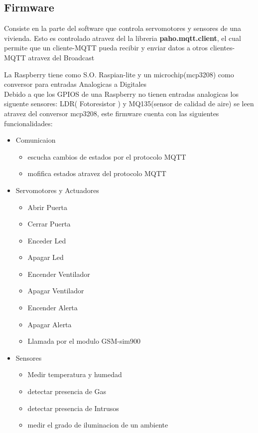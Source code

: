 \documentclass[letterpaper,12pt]{article}
\begin{document}
{\begin{figure}[h]
		\end{figure}
		
		\newpage
		\subsection{Firmware}
		
		Consiste en la parte del software que controla servomotores y sensores de una vivienda. Esto es controlado atravez del la libreria \textbf{paho.mqtt.client},  el cual permite que un cliente-MQTT pueda recibir y enviar datos a otros clientes-MQTT atravez del Broadcast
		
		La Raspberry tiene como S.O. Raspian-lite y un microchip(mcp3208) como conversor para entradas Analogicas a Digitales\\
		
		Debido a que los GPIOS de una Raspberry no tienen entradas analogicas los siguente sensores: LDR( Fotoresistor ) y MQ135(sensor  de calidad de aire) se leen atravez del conversor mcp3208, este firmware  cuenta con las siguientes funcionalidades:
		
		\begin{itemize}
			\item Comunicaion
			\begin{itemize}
				\item escucha cambios de estados por el protocolo MQTT
				\item mofifica estados atravez del protocolo MQTT
			\end{itemize}
			
			\item Servomotores y Actuadores 
			\begin{itemize}
				\item Abrir Puerta
				\item Cerrar Puerta
				\item Enceder Led
				\item Apagar Led
				\item Encender Ventilador
				\item Apagar Ventilador
				\item Encender Alerta
				\item Apagar Alerta
				\item Llamada por el modulo GSM-sim900
			\end{itemize}
			\item Sensores
			\begin{itemize}
				\item Medir temperatura y humedad
				\item detectar presencia de Gas
				\item detectar presencia de Intrusos
				\item medir el grado de iluminacion de un ambiente
				

\end{itemize}
\end{itemize}}
\end{document}
